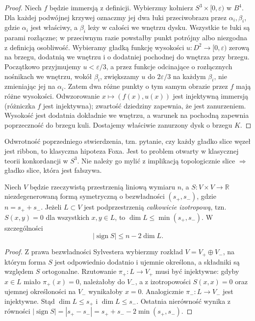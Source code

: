 \begin{proof}
Niech $f$ będzie immersją z definicji.
Wybierzmy kołnierz $S^3\times[0,\varepsilon)$
w $B^4$. Dla każdej podwójnej krzywej oznaczmy
jej dwa łuki przeciwobrazu przez $\alpha_i,\beta_i$,
gdzie $\alpha_i$ jest właściwy, a $\beta_i$
leży w całości we wnętrzu dysku. Wszystkie
te łuki są parami rozłączne; w przeciwnym razie
powstałby punkt potrójny albo niezgodna z
definicją osobliwość.
Wybieramy gładką funkcję wysokości
$u:D^2\to[0,\varepsilon)$ zerową na brzegu,
dodatnią we wnętrzu i o dodatniej pochodnej
do wnętrza przy brzegu. Początkowo przyjmujemy
$u<\varepsilon/3$, a przez funkcje odcinające
o rozłącznych nośnikach we wnętrzu, wokół
$\beta_i$, zwiększamy $u$ do $2\varepsilon/3$
na każdym $\beta_i$, nie zmieniając jej na
$\alpha_i$. Zatem dwa różne punkty o tym
samym obrazie przez $f$ mają różne wysokości.
Odwzorowanie $x\mapsto(f(x),u(x))$ jest
injektywną immersją (różniczka $f$ jest
injektywna); zwartość dziedziny zapewnia,
że jest zanurzeniem. Wysokość jest dodatnia
dokładnie we wnętrzu, a warunek na pochodną
zapewnia poprzeczność do brzegu kuli.
Dostajemy właściwie zanurzony dysk o brzegu
$K$.
\end{proof}

\begin{uwaga}
Odwrotność poprzedniego stwierdzenia, tzn. pytanie,
czy każdy gładko slice węzeł jest ribbon, to klasyczna
hipoteza Foxa. Jest to problem otwarty w klasycznej
teorii konkordancji w $S^3$.
Nie należy go mylić z implikacją topologicznie slice
$\Rightarrow$ gładko slice, która jest fałszywa.
\end{uwaga}

\begin{lemat}
\label{lem:kt-isotropic-signature}
Niech $V$ będzie rzeczywistą przestrzenią liniową
wymiaru $n$, a $S\colon V\times V\to\mathbb R$
niezdegenerowaną formą symetryczną o bezwładności
$(s_+,s_-)$, gdzie $n=s_++s_-$.
Jeżeli $L\subset V$ jest podprzestrzenią
\emph{całkowicie izotropową}, tzn.
$S(x,y)=0$ dla wszystkich $x,y\in L$,
to $\dim L\le\min(s_+,s_-)$.
W szczególności
\[
|\operatorname{sign}S|
\le n-2\dim L.
\]
\end{lemat}

\begin{proof}
Z prawa bezwładności Sylvestera wybierzmy rozkład
$V=V_+\oplus V_-$, na którym forma $S$
jest odpowiednio dodatnio i ujemnie określona,
a składniki są względem $S$ ortogonalne.
Rzutowanie $\pi_+\colon L\to V_+$
musi być injektywne: gdyby $x\in L$
miało $\pi_+(x)=0$, należałoby do $V_-$,
a z izotropowości $S(x,x)=0$ oraz
ujemnej określoności na $V_-$
wynikałoby $x=0$.
Analogicznie $\pi_-\colon L\to V_-$
jest injektywne. Stąd
$\dim L\le s_+$ i $\dim L\le s_-$.
Ostatnia nierówność wynika z równości
$|\operatorname{sign}S|=|s_+-s_-|
=s_++s_--2\min(s_+,s_-)$.
\end{proof}


